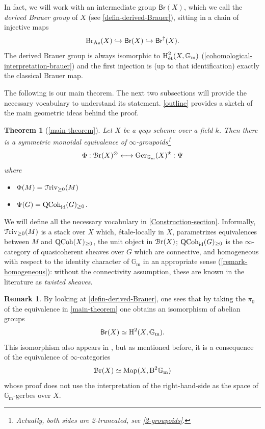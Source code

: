 \documentclass[11pt, twoside]{article} %
\numberwithin{equation}{section}
\theoremstyle{plain}
\newtheorem*{thm*}{Theorem}
\theoremstyle{definition}
\newtheorem{rem}[thm]{Remark}
\newcommand{\B}{\textup{B}}
\newcommand{\Map}{\textup{Map}}
\newcommand{\Gm}{\mathbb G_{\mathrm{m}}}
\newcommand{\id}{\textup{id}}
\newcommand{\QCoh}{\textup{QCoh}}
\newcommand{\Triv}{\mathcal{T}\textup{riv}}
\newcommand{\tH}{\textup{H}}
\newcommand{\Br}{\mathsf{Br}}
\newcommand{\cBr}{\mathcal{B}\textup{r}}
\newcommand{\Bre}{\mathsf{Br}^\dagger}
\newcommand{\Ger}{\textup{Ger}}
\newcommand{\ett}{{\textup{\'et}}}
\begin{document}
In fact, we will work with an intermediate group $\Br(X)$, which we call the \textit{derived Brauer group} of $X$ (see \cref{defin-derived-Brauer}), sitting in a chain of injective maps
$$\textup{Br}_{\textup{Az}}(X)\hookrightarrow \Br(X)\hookrightarrow \Bre(X).$$
The derived Brauer group is always isomorphic to $\tH^2_\ett(X,\Gm)$ (\cref{cohomological-interpretation-brauer}) and the first injection is (up to that identification) exactly the classical Brauer map.


The following is our main theorem. The next two subsections will provide the necessary vocabulary to understand its statement. \cref{outline} provides a sketch of the main geometric ideas behind the proof.
\begin{thm*}[\cref{main-theorem}]
		Let $X$ be a qcqs scheme over a field $k$. Then there is a symmetric monoidal equivalence of $\infty$-groupoids\footnote{Actually, both sides are 2-truncated, see \cref{2-groupoids}.}
		$$\Phi:\cBr(X)^{\otimes}\longleftrightarrow \Ger_{\Gm}(X)^{\mathlarger \star}:\Psi$$
		where
		\begin{itemize}
			\item $\Phi(M)=\Triv_{\geq 0}(M)$
			\item $\Psi(G)=\QCoh_\id(G)_{\geq 0}$.
		\end{itemize}
	\end{thm*}
	We will define all the necessary vocabulary in \cref{Construction-section}. Informally, $\Triv_{\geq 0}(M)$ is a stack over $X$ which, \'etale-locally in $X$, parametrizes equivalences between $M$ and $\QCoh(X)_{\geq 0}$, the unit object in $\cBr(X)$; $\QCoh_\id(G)_{\geq 0}$ is the $\infty$-category of quasicoherent sheaves over $G$ which are connective, and homogeneous with respect to the identity character of $\Gm$ in an appropriate sense (\cref{remark-homogeneous}): without the connectivity assumption, these are known in the literature as \textit{twisted sheaves}.
 
	\begin{rem}\label{derived-Brauer-H2}
	    By looking at \cref{defin-derived-Brauer}, one sees that by taking the $\pi_0$ of the equivalence in \cref{main-theorem} one obtains an isomorphism of abelian groups $$\Br(X)\simeq \tH^2(X,\Gm).$$ This isomorphism also appears in \cite[Example 11.5.7.15]{SAG}, but as mentioned before, it is a consequence of the equivalence of $\infty$-categories $$\cBr(X)\simeq \Map(X,\B^2\Gm)$$ whose proof does not use the interpretation of the right-hand-side as the space of $\Gm$-gerbes over $X$.
	\end{rem}
\end{document}
